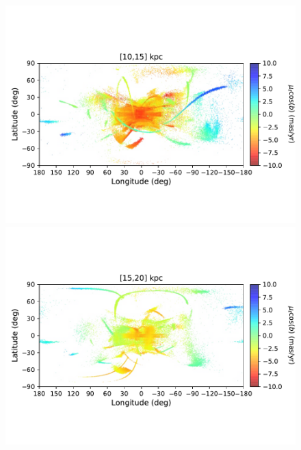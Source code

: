 \begin{figure}[h!]
\begin{center}
            \includegraphics[clip=true, trim = 0mm 20mm 0mm 20mm, width=0.9\columnwidth]{images/PII_ensemble_LB_D10-15_PML_new.pdf}
            \includegraphics[clip=true, trim = 0mm 20mm 0mm 20mm, width=0.9\columnwidth]{images/PII_ensemble_LB_D15-20_PML_new.pdf}


\end{center}
\end{figure}
